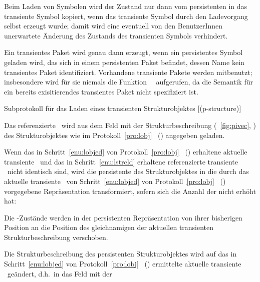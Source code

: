 %
\par{}Beim Laden von Symbolen wird der Zustand nur dann vom
persistenten in das transiente Symbol kopiert, wenn das transiente
Symbol durch den Ladevorgang selbst erzeugt wurde; damit wird eine
eventuell von den BenutzerInnen unerwartete \"{A}nderung des
Zustands des transienten Symbols verhindert.
%
\par{}Ein transientes Paket wird genau dann erzeugt, wenn ein
persistentes Symbol geladen wird, das sich in einem persistenten Paket
befindet, dessen Name kein transientes Paket identifiziert.
Vorhandene transiente Pakete werden \rglq{}mitbenutzt\rgrq; insbesondere
wird f\"{u}r sie niemals die Funktion
\ \ aufgerufen, da die Semantik
f\"{u}r ein bereits exisitierendes transientes Paket nicht spezifiziert
ist.
%
\begin{infol}%
%
\acaption%
 {Subprotokoll f\"{u}r das Laden eines transienten Strukturobjektes}%
 [(p-structure)]%
 \label{pro:lstr}%
\nopagebreak[4]%
%
\item\label{enu:lstrcld} Das referenzierte \clsdo\ wird aus dem Feld
mit der Strukturbeschreibung (\figurename~\ref{fig:pivec},
\citepage{\pageref{fig:pivec}}) des Strukturobjektes wie im
Protokoll~\ref{pro:lobj}
\ (\citepage{\pageref{pro:lobj}}) angegeben
geladen.
%
\item\label{enu:lstrse} Wenn das in Schritt~\ref{enu:lobjed} von
Protokoll~\ref{pro:lobj}
\ (\citepage{\pageref{enu:lobjed}}) erhaltene
aktuelle transiente \clsdo\ und das in Schritt~\ref{enu:lstrcld}
erhaltene referenzierte transiente \clsdo\ nicht identisch sind, wird
die persistente \representation{} des Strukturobjektes in die durch das
aktuelle transiente \clsdo\ von Schritt~\ref{enu:lobjed} von
Protokoll~\ref{pro:lobj} \
(\citepage{\pageref{enu:lobjed}}) vorgegebene Repr\"{a}sentation
transformiert, sofern sich die Anzahl der \Slt[s]\/ nicht erh\"{o}ht hat:
%
\begin{block}
%
\item Die \Slt\/-Zust\"{a}nde werden in der persistenten Repr\"{a}sentation
von ihrer bisherigen Position an die Position des gleichnamigen
\Slt[s]\/ der aktuellen transienten Strukturbeschreibung verschoben.
%
\item\label{enu:lstrupd} Die Strukturbeschreibung des persistenten
Strukturobjektes wird auf das in Schritt~\ref{enu:lobjed} von
Protokoll~\ref{pro:lobj}
\ (\citepage{\pageref{enu:lobjed}}) ermittelte
aktuelle transiente \clsdo\ ge\-\"{a}n\-dert, d.h.\ in das Feld mit der

\end{block}
\end{infol}
